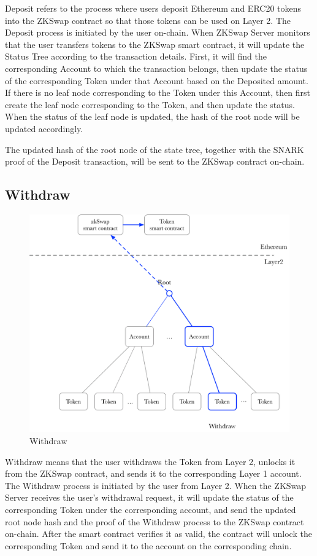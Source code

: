 \documentclass[]{template/llncs}
\begin{document}
Deposit refers to the process where users deposit Ethereum and ERC20 tokens into the ZKSwap contract so that those tokens can be used on Layer 2. The Deposit process is initiated by the user on-chain. When ZKSwap Server monitors that the user transfers tokens to the ZKSwap smart contract, it will update the Status Tree according to the transaction details. First, it will find the corresponding Account to which the transaction belongs, then update the status of the corresponding Token under that Account based on the Deposited amount. If there is no leaf node corresponding to the Token under this Account, then first create the leaf node corresponding to the Token, and then update the status. When the status of the leaf node is updated, the hash of the root node will be updated accordingly.

The updated hash of the root node of the state tree, together with the SNARK proof of the Deposit transaction, will be sent to the ZKSwap contract on-chain.

\subsection{Withdraw}

\begin{figure}[htbp]
\centering
\includegraphics[width=0.9\columnwidth]{figure/withdraw}
\caption{Withdraw}
\label{fig:withdraw}
\end{figure}

Withdraw means that the user withdraws the Token from Layer 2, unlocks it from the ZKSwap contract, and sends it to the corresponding Layer 1 account. The Withdraw process is initiated by the user from Layer 2. When the ZKSwap Server receives the user’s withdrawal request, it will update the status of the corresponding Token under the corresponding account, and send the updated root node hash and the proof of the Withdraw process to the ZKSwap contract on-chain. After the smart contract verifies it as valid, the contract will unlock the corresponding Token and send it to the account on the corresponding chain.
\end{document}
